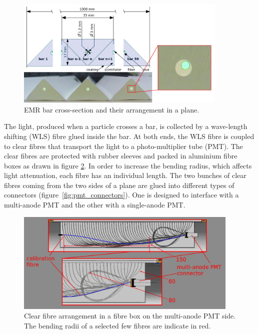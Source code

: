 \documentclass[a4paper,11pt]{article}
\begin{document}
\begin{figure}[htp!]
 \centering
 \includegraphics[width=0.9\textwidth]{./bar_arrangement_in_a_plane}
 \caption[EMR bar cross-section and plane arrangement]{EMR bar cross-section and their arrangement in a plane.}
 \label{fig:bar_arrangement_in_a_plane}
\end{figure}


The light, produced when a particle crosses a bar, is collected by a wave-length shifting (WLS) fibre glued inside the bar. 
At both ends, the WLS fibre is coupled to clear fibres that transport the light to a photo-multiplier
tube (PMT). The clear fibres are protected with rubber sleeves and packed in aluminium fibre boxes as drawn in figure 
\ref{fig:clear_fibre_package}. In order to increase the bending radius, which affects light attenuation, each fibre has an individual
length. The two bunches of clear fibres coming from the two sides of a plane are glued into different types of connectors (figure~\ref{fig:pmt_connectors}).
One is designed to interface with a multi-anode PMT and the other with a single-anode PMT.

\begin{figure}[ht]
 \centering
 \includegraphics[width=0.95\textwidth]{./clear_fiber_package}
 \caption[A package of clear fibres in a fibre box]{Clear fibre arrangement in a fibre box on the  multi-anode PMT side. The bending radii of a selected few fibres are indicate in red.}
 \label{fig:clear_fibre_package}
\end{figure}
\end{document}
